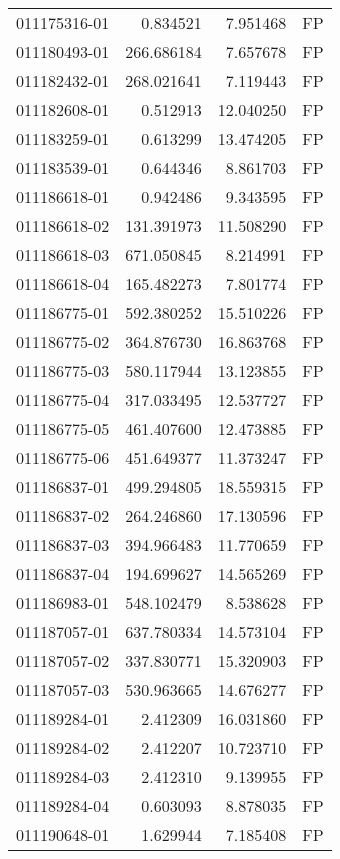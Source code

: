\begin{tabular}{lrrl}
011175316-01 &    0.834521 &     7.951468 &   FP \\
011180493-01 &  266.686184 &     7.657678 &   FP \\
011182432-01 &  268.021641 &     7.119443 &   FP \\
011182608-01 &    0.512913 &    12.040250 &   FP \\
011183259-01 &    0.613299 &    13.474205 &   FP \\
011183539-01 &    0.644346 &     8.861703 &   FP \\
011186618-01 &    0.942486 &     9.343595 &   FP \\
011186618-02 &  131.391973 &    11.508290 &   FP \\
011186618-03 &  671.050845 &     8.214991 &   FP \\
011186618-04 &  165.482273 &     7.801774 &   FP \\
011186775-01 &  592.380252 &    15.510226 &   FP \\
011186775-02 &  364.876730 &    16.863768 &   FP \\
011186775-03 &  580.117944 &    13.123855 &   FP \\
011186775-04 &  317.033495 &    12.537727 &   FP \\
011186775-05 &  461.407600 &    12.473885 &   FP \\
011186775-06 &  451.649377 &    11.373247 &   FP \\
011186837-01 &  499.294805 &    18.559315 &   FP \\
011186837-02 &  264.246860 &    17.130596 &   FP \\
011186837-03 &  394.966483 &    11.770659 &   FP \\
011186837-04 &  194.699627 &    14.565269 &   FP \\
011186983-01 &  548.102479 &     8.538628 &   FP \\
011187057-01 &  637.780334 &    14.573104 &   FP \\
011187057-02 &  337.830771 &    15.320903 &   FP \\
011187057-03 &  530.963665 &    14.676277 &   FP \\
011189284-01 &    2.412309 &    16.031860 &   FP \\
011189284-02 &    2.412207 &    10.723710 &   FP \\
011189284-03 &    2.412310 &     9.139955 &   FP \\
011189284-04 &    0.603093 &     8.878035 &   FP \\
011190648-01 &    1.629944 &     7.185408 &   FP \\

\end{tabular}

